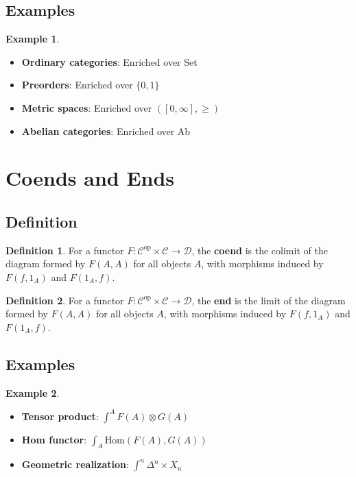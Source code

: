 \documentclass[11pt]{article}
\theoremstyle{definition}
\newtheorem{definition}{Definition}[section]
\newtheorem{example}{Example}[section]
\begin{document}
\subsection{Examples}
\begin{example}
\begin{itemize}
    \item \textbf{Ordinary categories}: Enriched over Set
    \item \textbf{Preorders}: Enriched over $\{0,1\}$
    \item \textbf{Metric spaces}: Enriched over $([0,\infty], \geq)$
    \item \textbf{Abelian categories}: Enriched over Ab
\end{itemize}
\end{example}

\section{Coends and Ends}

\subsection{Definition}
\begin{definition}
For a functor $F: \mathcal{C}^{\text{op}} \times \mathcal{C} \to \mathcal{D}$, the \textbf{coend} is the colimit of the diagram formed by $F(A,A)$ for all objects $A$, with morphisms induced by $F(f, 1_A)$ and $F(1_A, f)$.
\end{definition}

\begin{definition}
For a functor $F: \mathcal{C}^{\text{op}} \times \mathcal{C} \to \mathcal{D}$, the \textbf{end} is the limit of the diagram formed by $F(A,A)$ for all objects $A$, with morphisms induced by $F(f, 1_A)$ and $F(1_A, f)$.
\end{definition}

\subsection{Examples}
\begin{example}
\begin{itemize}
    \item \textbf{Tensor product}: $\int^A F(A) \otimes G(A)$
    \item \textbf{Hom functor}: $\int_A \text{Hom}(F(A), G(A))$
    \item \textbf{Geometric realization}: $\int^n \Delta^n \times X_n$
\end{itemize}
\end{example}
\end{document}
